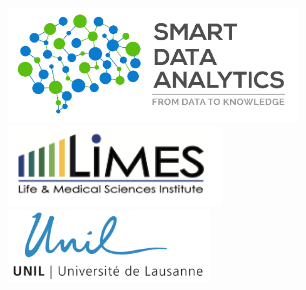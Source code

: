 \begin{frame}
\begin{columns}[t]
	\centering \\ \vspace{-0.5cm}
	\includegraphics[width=0.575\textwidth]{material/crop-cooperation-sda.png} \\ \vspace{0.85cm}
	\includegraphics[width=0.425\textwidth]{material/crop-cooperation-limes.png} \\ \vspace{0.4cm}
 	\includegraphics[width=0.4\textwidth]{material/crop-cooperation-lausanne.png} \\

\centering \\

\end{columns}

\end{frame}
